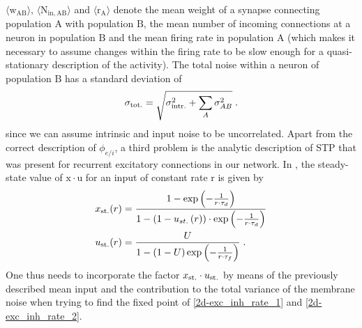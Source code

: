 \documentclass[10pt,a4paper]{article}
\begin{document}
$\mathrm{\langle w_{AB} \rangle,\, \langle N_{\mathrm{in},AB} \rangle}$ and $\mathrm{\langle r_A \rangle}$ denote the mean weight of a synapse connecting population $\mathrm{A}$ with population $\mathrm{B}$, the mean number of incoming connections at a neuron in population $\mathrm{B}$ and the mean firing rate in population $\mathrm{A}$ (which makes it necessary to assume changes within the firing rate to be slow enough for a quasi-stationary description of the activity).
The total noise within a neuron of population $\mathrm{B}$ has a standard deviation of 
\begin{equation}
\sigma_{\rm tot.} = \sqrt{\sigma_{\rm intr.}^2 + \sum_A \sigma_{AB}^2} \; .
\label{Total_Noise_Neuron}
\end{equation}
since we can assume intrinsic and input noise to be uncorrelated. Apart from the correct description of $\phi_{e/i}$, a third problem is the analytic description of STP that was present for recurrent excitatory connections in our network. In \cite{Markram_STP}, the steady-state value of $\mathrm{x\cdot u}$ for an input of constant rate $\mathrm{r}$ is given by
\begin{align}
x_{\rm st.}(r) &= \frac{1-\exp \left(-\frac{1}{r\cdot \tau _d}\right)}{1-\left(1-u_{st.}\left(r\right)\right)\cdot \exp \left(-\frac{1}{r\cdot \tau _d}\right)} \label{STP_steady1} \\
u_{\rm st.}(r) &= \frac{U}{1-\left(1-U\right)\exp \left(-\frac{1}{r\cdot \tau _f}\right)} \; .\label{STP_steady2}
\end{align}
One thus needs to incorporate the factor $x_{\rm st.}\cdot u_{\rm st.}$ by means of the previously described mean input and the contribution to the total variance of the membrane noise when trying to find the fixed point of \eqref{2d-exc_inh_rate_1} and \eqref{2d-exc_inh_rate_2}.
 
\end{document}
